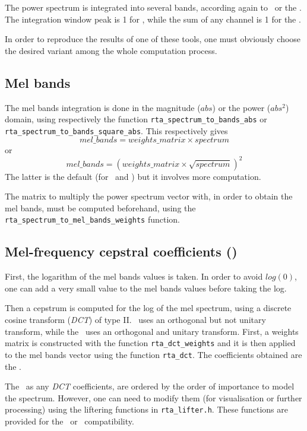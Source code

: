 \documentclass[a4paper, twoside]{article}
\begin{document}
The power spectrum is integrated into several bands, according again
to \htk\ or the \atb. The integration
window peak is 1 for \htk, while the sum of any channel is 1
for the \atb.

In order to reproduce the results of one of these tools, one must
obviously choose the desired variant among the whole computation
process.

\subsection{Mel bands}
\label{sec:mel}

The mel bands integration is done in the magnitude ($abs$) or the
power ($abs^2$) domain, using respectively the function
\texttt{rta\_spectrum\_to\_bands\_abs} or
\texttt{rta\_spectrum\_to\_bands\_square\_abs}. This respectively
gives
$$ mel\_bands = weights\_matrix \times spectrum $$
or
$$ mel\_bands = (weights\_matrix \times \sqrt{spectrum})^2 $$
The latter is the default (for \htk\ and \atb) but it involves more
computation.

The matrix to multiply the power spectrum vector with, in order to
obtain the mel bands, must be computed beforehand, using the
\texttt{rta\_spectrum\_to\_mel\_bands\_weights} function.


\subsection{Mel-frequency cepstral coefficients (\mfcc)}
\label{sec:mfcc}

First, the logarithm of the mel bands values is taken. In order to
avoid $log(0)$, one can add a very small value to the mel bands
values before taking the log.

Then a cepstrum is computed for the log of the mel spectrum, using a
discrete cosine transform (\textit{DCT}) of type II. \htk\
uses an orthogonal but not unitary transform, while the \atb\ uses an
orthogonal and unitary transform. First, a weights matrix is
constructed with the function \texttt{rta\_dct\_weights} and it is
then applied to the mel bands vector using the function
\texttt{rta\_dct}. The coefficients obtained are the \mfcc.

The \mfcc\, as any \textit{DCT} coefficients, are ordered by the order
of importance to model the spectrum. However, one can need to modify
them (for visualisation or further processing) using the liftering
functions in \texttt{rta\_lifter.h}. These functions are provided for
the \htk\ or \atb\ compatibility.
\end{document}
